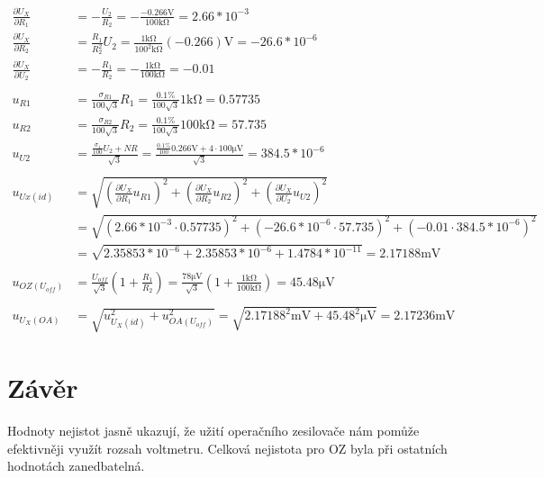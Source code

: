 \documentclass{article}
\begin{document}
$$
\begin{aligned}
	\frac{\partial U_X}{\partial R_1} &= -\frac{U_2}{R_2} = -\frac{-0.266 \si{\volt}}{100\si{\kilo\ohm}} = 2.66*10^{-3}\\
	\frac{\partial U_X}{\partial R_2} &= \frac{R_1}{R_2^2}U_2 = \frac{1\si{\kilo\ohm}}{100^2\si{\kilo\ohm}}(-0.266) \si{\volt} = -26.6*10^{-6}\\
	\frac{\partial U_X}{\partial U_2} &= -\frac{R_1}{R_2} = -\frac{1\si{\kilo\ohm}}{100\si{\kilo\ohm}} = -0.01\\
	\\
	u_{R1} &= \frac{\sigma_{R1}}{100\sqrt{3}}R_1 = \frac{0.1\%}{100\sqrt{3}}1\si{\kilo\ohm} = 0.57735\\
	u_{R2} &= \frac{\sigma_{R2}}{100\sqrt{3}}R_2 = \frac{0.1\%}{100\sqrt{3}}100\si{\kilo\ohm} = 57.735\\
	u_{U2}&=\frac{ \frac{\sigma_1}{100}U_2 + NR }{\sqrt{3}}=\frac{	\frac{0.1\%}{100}0.266 \si{\volt} + 4 \cdot 100 \si{\micro\volt}}{\sqrt{3}} = 384.5*10^{-6}\\
	\\
	u_{Ux(id)}&=\sqrt{(\frac{\partial U_X}{\partial R_1}u_{R1})^2 + (\frac{\partial U_X}{\partial R_2}u_{R2})^2 + (\frac{\partial U_X}{\partial U_2}u_{U2})^2}\\
	 &= \sqrt{(2.66 *10^{-3} \cdot 0.57735)^2 + (-26.6*10^{-6} \cdot 57.735)^2 + (-0.01 \cdot 384.5*10^{-6})^2}\\
	 &= \sqrt{2.35853*10^{-6}+2.35853*10^{-6}+1.4784*10^{-11}} = 2.17188 \si{\milli\volt}\\
	 \\
	 u_{OZ(U_{off})} &= \frac{U_{off}}{\sqrt{3}}(1+\frac{R_1}{R_2})=\frac{78 \si{\micro\volt}}{\sqrt{3}}(1+\frac{1\si{\kilo\ohm}}{100\si{\kilo\ohm}}) = 45.48 \si{\micro\volt}\\
	 \\
	 u_{U_X(OA)}&=\sqrt{u_{U_X(id)}^2+u_{OA(U_{off})}^2} = \sqrt{2.17188^2 \si{\milli\volt}+45.48^2 \si{\micro\volt}}=2.17236 \si{\milli\volt}
\end{aligned}
$$

\section{Závěr}

Hodnoty nejistot jasně ukazují, že užití operačního zesilovače nám pomůže efektivněji využít rozsah voltmetru. Celková nejistota pro OZ byla při ostatních hodnotách zanedbatelná.
\end{document}
